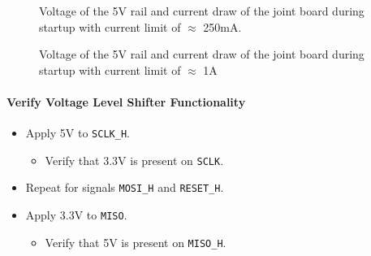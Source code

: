 \begin{figure}[h]
	\centering
	
	\caption{Voltage of the 5V rail and current draw of the joint board during startup with current limit of $\approx$ 250mA.}
	\label{fig:joint_curr_limit}
\end{figure}

\begin{figure}[h]
	\centering
	
	\caption{Voltage of the 5V rail and current draw of the joint board during startup with current limit of $\approx$ 1A}
	\label{fig:joint_no_curr_limit}
\end{figure}

\paragraph{Verify Voltage Level Shifter Functionality} %
\label{par:verify_voltage_level_shifter_functionality}
\begin{itemize}
	\item Apply 5V to \texttt{SCLK\_H}.
	\begin{itemize}
		\item[\cmark]  Verify that 3.3V is present on \texttt{SCLK}.
	\end{itemize}
	\item Repeat for signals \texttt{MOSI\_H} and \texttt{RESET\_H}.
	\item Apply 3.3V to \texttt{MISO}.
	\begin{itemize}
		\item[\cmark]  Verify that 5V is present on \texttt{MISO\_H}.
	\end{itemize}
\end{itemize}


